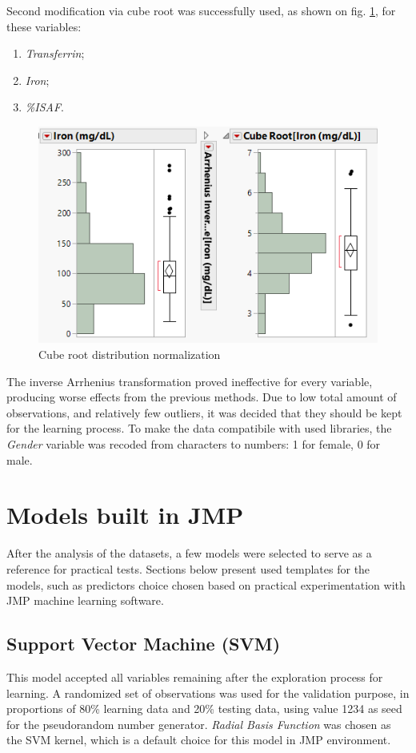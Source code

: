 	Second modification via cube root was successfully used, as shown on fig. \ref{fig:cube2}, for these variables:
	
	\begin{enumerate}
		\item \textit{Transferrin};
		\item \textit{Iron};
		\item \textit{\%ISAF}.
	\end{enumerate}

	\begin{figure}
		\centering
		\includegraphics[width=0.5\linewidth]{Rozdzial3/cube2}
		\caption{Cube root distribution normalization}
		\label{fig:cube2}
	\end{figure}

	\newpage
	The inverse Arrhenius transformation proved ineffective for every variable, producing worse effects from the previous methods. Due to low total amount of observations, and relatively few outliers, it was decided that they should be kept for the learning process. To make the data compatibile with used libraries, the \textit{Gender} variable was recoded from characters to numbers: 1 for female, 0 for male.

\section{Models built in JMP}

After the analysis of the datasets, a few models were selected to serve as a reference for practical tests. Sections below present used templates for the models, such as predictors choice chosen based on practical experimentation with JMP machine learning software.

\subsection{Support Vector Machine (SVM)}

This model accepted all variables remaining after the exploration process for learning. A randomized set of observations was used for the validation purpose, in proportions of 80\% learning data and 20\% testing data, using value 1234 as seed for the pseudorandom number generator. \textit{Radial Basis Function} was chosen as the SVM kernel, which is a default choice for this model in JMP environment.

